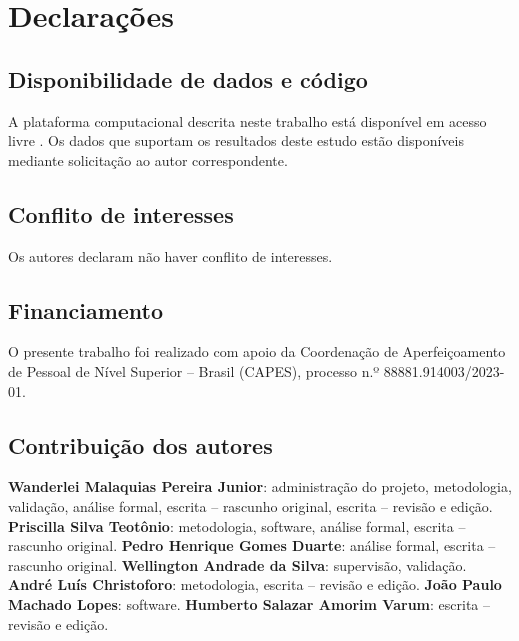 \section*{Declarações}

\subsection*{Disponibilidade de dados e código}
A plataforma computacional descrita neste trabalho está disponível em acesso livre \parencite{ReliaBridge2026}. Os dados que suportam os resultados deste estudo estão disponíveis mediante solicitação ao autor correspondente.

\subsection*{Conflito de interesses}
Os autores declaram não haver conflito de interesses.

\subsection*{Financiamento}
O presente trabalho foi realizado com apoio da Coordenação de Aperfeiçoamento de Pessoal de Nível Superior -- Brasil (CAPES), processo n.º 88881.914003/2023-01.

\subsection*{Contribuição dos autores}
\textbf{Wanderlei Malaquias Pereira Junior}: administração do projeto, metodologia, validação, análise formal, escrita -- rascunho original, escrita -- revisão e edição.
\textbf{Priscilla Silva Teotônio}: metodologia, software, análise formal, escrita -- rascunho original.
\textbf{Pedro Henrique Gomes Duarte}: análise formal, escrita -- rascunho original.
\textbf{Wellington Andrade da Silva}: supervisão, validação.
\textbf{André Luís Christoforo}: metodologia, escrita -- revisão e edição.
\textbf{João Paulo Machado Lopes}: software.
\textbf{Humberto Salazar Amorim Varum}: escrita -- revisão e edição.
